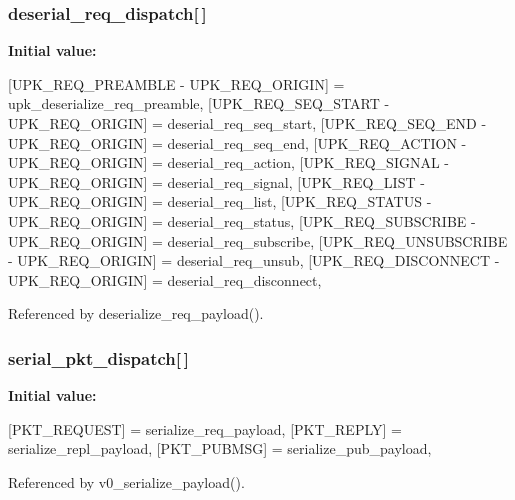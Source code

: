 \subsubsection[{deserial\_\-req\_\-dispatch}]{ {\bf deserial\_\-req\_\-dispatch}[$\,$]\hspace{0.3cm}{\ttfamily  [static]}}\label{upk__v0__protocol__serializer_8c_a7374e093f0fbf29244bce257767cb7d9}
{\bfseries Initial value:}
\begin{DoxyCode}
 {
    [UPK_REQ_PREAMBLE - UPK_REQ_ORIGIN] = upk_deserialize_req_preamble,
    [UPK_REQ_SEQ_START - UPK_REQ_ORIGIN] = deserial_req_seq_start,
    [UPK_REQ_SEQ_END - UPK_REQ_ORIGIN] = deserial_req_seq_end,
    [UPK_REQ_ACTION - UPK_REQ_ORIGIN] = deserial_req_action,
    [UPK_REQ_SIGNAL - UPK_REQ_ORIGIN] = deserial_req_signal,
    [UPK_REQ_LIST - UPK_REQ_ORIGIN] = deserial_req_list,
    [UPK_REQ_STATUS - UPK_REQ_ORIGIN] = deserial_req_status,
    [UPK_REQ_SUBSCRIBE - UPK_REQ_ORIGIN] = deserial_req_subscribe,
    [UPK_REQ_UNSUBSCRIBE - UPK_REQ_ORIGIN] = deserial_req_unsub,
    [UPK_REQ_DISCONNECT - UPK_REQ_ORIGIN] = deserial_req_disconnect,
}
\end{DoxyCode}


Referenced by deserialize\_\-req\_\-payload().

\subsubsection[{serial\_\-pkt\_\-dispatch}]{ {\bf serial\_\-pkt\_\-dispatch}[$\,$]\hspace{0.3cm}{\ttfamily  [static]}}\label{upk__v0__protocol__serializer_8c_a066174863784e6367e72582cba603995}
{\bfseries Initial value:}
\begin{DoxyCode}
 {
    [PKT_REQUEST] = serialize_req_payload,
    [PKT_REPLY] = serialize_repl_payload,
    [PKT_PUBMSG] = serialize_pub_payload,
}
\end{DoxyCode}


Referenced by v0\_\-serialize\_\-payload().

